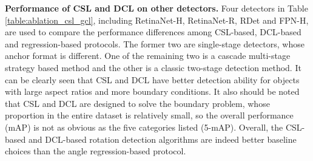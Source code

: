 \documentclass[10pt,journal,compsoc]{IEEEtran}
\begin{document}
\begin{table}[tb!]
	\centering
	\caption{Ablation experiment of our proposed angle fine-tuning technique on the HRSC2016 dataset. The baseline is RetinaNet.}
	\label{table:ablation_angle_fine_tuning}
\end{table}


\noindent \textbf{Performance of CSL and DCL on other detectors.}
Four detectors in Table \ref{table:ablation_csl_gcl}, including RetinaNet-H, RetinaNet-R, RDet and FPN-H, are used to compare the performance differences among CSL-based, DCL-based and regression-based protocols. The former two are single-stage detectors, whose anchor format is different. 
One of the remaining two is a cascade multi-stage strategy based method and the other is a classic two-stage detection method.
It can be clearly seen that CSL and DCL have better detection ability for objects with large aspect ratios and more boundary conditions. It also should be noted that CSL and DCL are designed to solve the boundary problem, whose proportion in the entire dataset is relatively small, so the overall performance (mAP) is not as obvious as the five categories listed (5-mAP). Overall, the CSL-based and DCL-based rotation detection algorithms are indeed better baseline choices than the angle regression-based protocol.
\end{document}
